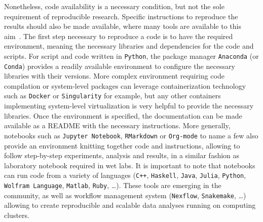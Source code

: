 Nonetheless, code availability is a necessary condition, but not the sole requirement of reproducible research.
Specific instructions to reproduce the results should also be made available, where many tools are available to this aim~\citep{Wilson2014,Darriba2018}.
The first step necessary to reproduce a code is to have the required environment, meaning the necessary libraries and dependencies for the code and scripts.
For script and code written in \texttt{Python}, the package manager \texttt{Anaconda} (or \texttt{Conda}) provides a readily available environment to configure the necessary libraries with their versions.
More complex environment requiring code compilation or system-level packages can leverage containerization technology such as \texttt{Docker} or \texttt{Singularity} for example, but any other containers implementing system-level virtualization is very helpful to provide the necessary libraries.
Once the environment is specified, the documentation can be made available as a README with the necessary instructions.
More generally, notebooks such as \texttt{Jupyter Notebook}, \texttt{RMarkdown} or \texttt{Org-mode} to name a few also provide an environment knitting together code and instructions, allowing to follow step-by-step experiments, analysis and results, in a similar fashion as laboratory notebook required in wet labs.
It is important to note that notebooks can run code from a variety of languages (\texttt{C++}, \texttt{Haskell}, \texttt{Java}, \texttt{Julia}, \texttt{Python}, \texttt{Wolfram Language}, \texttt{Matlab}, \texttt{Ruby}, \ldots).
These tools are emerging in the community, as well as workflow management system (\texttt{Nexflow}, \texttt{Snakemake}, \ldots) allowing to create reproducible and scalable data analyses running on computing clusters.

